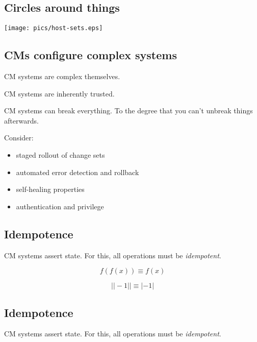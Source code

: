 \documentclass[xga]{xdvislides}
\begin{document}
\subsection{Circles around things}
\vspace*{\fill}
\begin{center}
	\texttt{[image: pics/host-sets.eps]} \\
\end{center}
\vspace*{\fill}

\subsection{CMs configure complex systems}
CM systems are complex themselves. \\
\vspace{.25in}

CM systems are inherently trusted. \\
\vspace{.25in}

CM systems can break everything.  To the degree that
you can't unbreak things afterwards. \\
\vspace{.5in}

Consider:
\begin{itemize}
	\item staged rollout of change sets
	\item automated error detection and rollback
	\item self-healing properties
	\item authentication and privilege
\end{itemize}


\subsection{Idempotence}
CM systems assert state.  For this, all operations
must be {\em idempotent}. \\
\vspace{.5in}

\begin{displaymath}
f(f(x)) \equiv f(x)
\end{displaymath}

\begin{displaymath}
| |-1| | \equiv |-1|
\end{displaymath}

\subsection{Idempotence}
CM systems assert state.  For this, all operations
must be {\em idempotent}. \\
\vspace{.5in}
\end{document}
